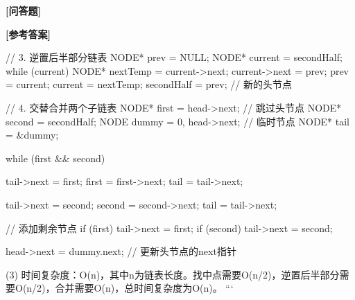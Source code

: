 \documentclass[12pt,a4paper]{article}
\newenvironment{choicequestion}[1][]{%
    \vspace{0.5cm}
    \noindent\textbf{[#1]}
    \vspace{0.2cm}
}{}
\newenvironment{answersection}{%
    \vspace{0.2cm}
    \noindent\textbf{[参考答案]}\\
    \vspace{0.1cm}
}{}
\begin{document}
\begin{choicequestion}[问答题]
\begin{answersection}
{    // 3. 逆置后半部分链表
    NODE* prev = NULL;
    NODE* current = secondHalf;
    while (current) {
        NODE* nextTemp = current->next;
        current->next = prev;
        prev = current;
        current = nextTemp;
    }
    secondHalf = prev;  // 新的头节点
    
    // 4. 交替合并两个子链表
    NODE* first = head->next;  // 跳过头节点
    NODE* second = secondHalf;
    NODE dummy = {0, head->next};  // 临时节点
    NODE* tail = &dummy;
    
    while (first && second) {
        tail->next = first;
        first = first->next;
        tail = tail->next;
        
        tail->next = second;
        second = second->next;
        tail = tail->next;
    }
    
    // 添加剩余节点
    if (first) {
        tail->next = first;
    }
    if (second) {
        tail->next = second;
    }
    
    head->next = dummy.next;  // 更新头节点的next指针
}

(3) 时间复杂度：O(n)，其中n为链表长度。找中点需要O(n/2)，逆置后半部分需要O(n/2)，合并需要O(n)，总时间复杂度为O(n)。
```


\end{choicequestion}
\end{document}
